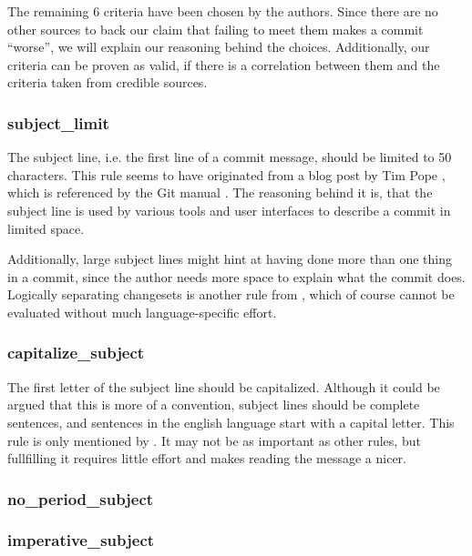 The remaining 6 criteria have been chosen by the authors. Since there are no other sources to back our claim that failing to meet them makes a commit ``worse'', we will explain our reasoning behind the choices. Additionally, our criteria can be proven as valid, if there is a correlation between them and the criteria taken from credible sources. %


\subsubsection{subject_limit}
\label{subs:subject_limit}
The subject line, i.e. the first line of a commit message, should be limited to 50 characters. This rule seems to have originated from a blog post by Tim Pope \cite{TP}, which is referenced by the Git manual \cite{OffGuide}. The reasoning behind it is, that the subject line is used by various tools and user interfaces to describe a commit in limited space.

Additionally, large subject lines might hint at having done more than one thing in a commit, since the author needs more space to explain what the commit does. Logically separating changesets is another rule from \cite{OffGuide}, which of course cannot be evaluated without much language-specific effort.

\subsubsection{capitalize_subject}
\label{subs:capitalize_subject}
The first letter of the subject line should be capitalized. Although it could be argued that this is more of a convention, subject lines should be complete sentences, and sentences in the english language start with a capital letter. This rule is only mentioned by \cite{CB}. It may not be as important as other rules, but fullfilling it requires little effort and makes reading the message a nicer.

\subsubsection{no_period_subject}
\label{subs:no_period_subject}

\subsubsection{imperative_subject}
\label{subs:imperative_subject}


